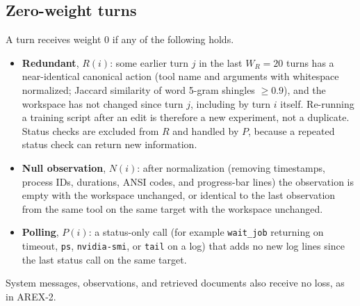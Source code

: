 \documentclass[11pt]{article}
\newcommand{\code}[1]{\texttt{#1}}
\begin{document}
\subsection{Zero-weight turns}
A turn receives weight 0 if any of the following holds.
\begin{itemize}
  \item \textbf{Redundant}, $R(i)$: some earlier turn $j$ in the last $W_R = 20$ turns has a near-identical canonical action (tool name and arguments with whitespace normalized; Jaccard similarity of word 5-gram shingles $\ge 0.9$), and the workspace has not changed since turn $j$, including by turn $i$ itself. Re-running a training script after an edit is therefore a new experiment, not a duplicate. Status checks are excluded from $R$ and handled by $P$, because a repeated status check can return new information.
  \item \textbf{Null observation}, $N(i)$: after normalization (removing timestamps, process IDs, durations, ANSI codes, and progress-bar lines) the observation is empty with the workspace unchanged, or identical to the last observation from the same tool on the same target with the workspace unchanged.
  \item \textbf{Polling}, $P(i)$: a status-only call (for example \code{wait\_job} returning on timeout, \code{ps}, \code{nvidia-smi}, or \code{tail} on a log) that adds no new log lines since the last status call on the same target.
\end{itemize}
System messages, observations, and retrieved documents also receive no loss, as in AREX-2.
\end{document}
